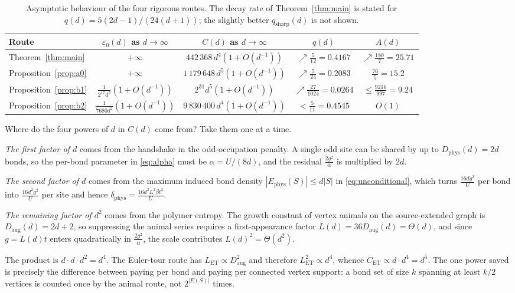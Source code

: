 \documentclass[11pt]{article}
\theoremstyle{plain}
\theoremstyle{definition}
\newcommand{\Dphys}{D_{\mathrm{phys}}}
\newcommand{\Daug}{D_{\mathrm{aug}}}
\begin{document}
\begin{table}[t]
\centering
\small
\setlength{\tabcolsep}{6pt}
\begin{tabular}{@{}lcccc@{}}
\hline
Route & $\varepsilon_0(d)$ as $d\to\infty$ & $C(d)$ as $d\to\infty$ & $q(d)$ & $A(d)$\\
\hline
Theorem~\ref{thm:main}  & $+\infty$ & $442\,368\,d^4(1+O(d^{-1}))$ & $\nearrow\frac5{12}=0.4167$ & $\nearrow\frac{180}7=25.71$\\
Proposition~\ref{prop:a0} & $+\infty$ & $1\,179\,648\,d^5(1+O(d^{-1}))$ & $\nearrow\frac5{24}=0.2083$ & $\frac{76}5=15.2$\\
Proposition~\ref{prop:b1} & $\frac1{2^{17}d^3}(1+O(d^{-1}))$ & $2^{31}d^5(1+O(d^{-1}))$ & $\nearrow\frac{27}{1024}=0.0264$ & $\le\frac{9216}{997}=9.24$\\
Proposition~\ref{prop:b2} & $\frac1{7680d^2}(1+O(d^{-1}))$ & $9\,830\,400\,d^4(1+O(d^{-1}))$ & $<\frac5{11}=0.4545$ & $O(1)$\\
\hline
\end{tabular}
\caption{Asymptotic behaviour of the four rigorous routes. The decay rate of
Theorem~\ref{thm:main} is stated for $q(d)=5(2d-1)/(24(d+1))$; the slightly better
$q_{\mathrm{sharp}}(d)$ is not shown.}
\label{tab:asymptotics}
\end{table}

Where do the four powers of $d$ in $C(d)$ come from? Take them one at a time.

\emph{The first factor of $d$} comes from the handshake in the odd-occupation
penalty. A single odd site can be shared by up to $\Dphys(d)=2d$ bonds, so the
per-bond parameter in \eqref{eq:alpha} must be $\alpha=U/(8d)$, and the residual
$\frac{2g^2}{\alpha}$ is multiplied by $2d$.

\emph{The second factor of $d$} comes from the maximum induced bond density
$|E_{\mathrm{phys}}(S)|\le d|S|$ in \eqref{eq:unconditional}, which turns
$\frac{16dg^2}{U}$ per bond into $\frac{16d^2g^2}{U}$ per site and hence
$\delta_{\mathrm{phys}}=\frac{16d^2L^2\beta t^2}{U}$.

\emph{The remaining factor of $d^2$} comes from the polymer entropy. The growth
constant of vertex animals on the source-extended graph is $\Daug(d)=2d+2$, so
suppressing the animal series requires a first-appearance factor
$L(d)=36\Daug(d)=\Theta(d)$, and since $g=L(d)t$ enters quadratically in
$\frac{2g^2}{\alpha}$, the scale contributes $L(d)^2=\Theta(d^2)$.

The product is $d\cdot d\cdot d^2=d^4$. The Euler-tour route has $L_{\mathrm{ET}}\propto\Daug^2$
and therefore $L_{\mathrm{ET}}^2\propto d^4$, whence $C_{\mathrm{ET}}\propto d\cdot d^4=d^5$.
The one power saved is precisely the difference between paying per bond and paying
per connected vertex support: a bond set of size $k$ spanning at least $k/2$ vertices
is counted once by the animal route, not $2^{|E(S)|}$ times.
\end{document}
